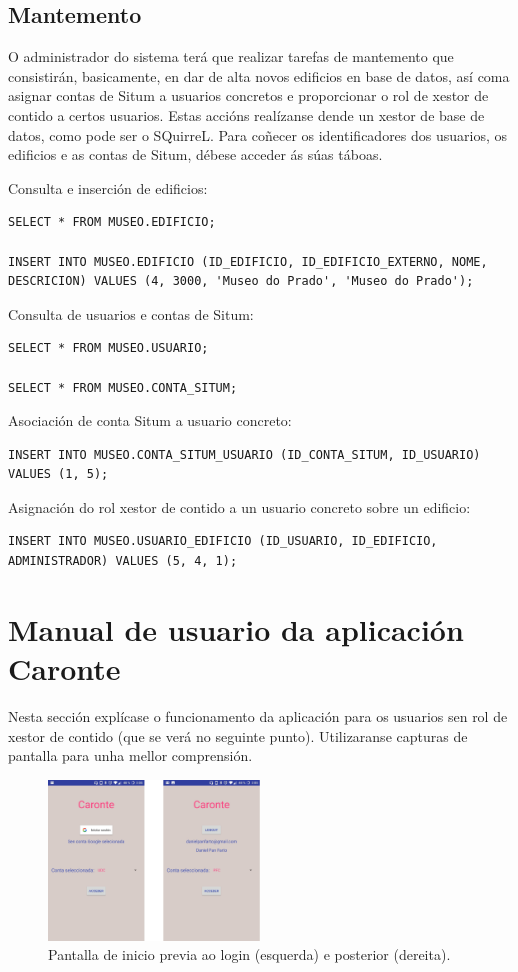 \subsection{Mantemento}
O administrador do sistema terá que realizar tarefas de mantemento que consistirán, basicamente, en dar de alta novos edificios en base de datos, así coma asignar contas de Situm a usuarios concretos e proporcionar o rol de xestor de contido a certos usuarios. Estas accións realízanse dende un xestor de base de datos, como pode ser o SQuirreL. Para coñecer os identificadores dos usuarios, os edificios e as contas de Situm, débese acceder ás súas táboas.

Consulta e inserción de edificios:
\begin{lstlisting}
SELECT * FROM MUSEO.EDIFICIO;

INSERT INTO MUSEO.EDIFICIO (ID_EDIFICIO, ID_EDIFICIO_EXTERNO, NOME, DESCRICION) VALUES (4, 3000, 'Museo do Prado', 'Museo do Prado');
\end{lstlisting}

Consulta de usuarios e contas de Situm:
\begin{lstlisting}
SELECT * FROM MUSEO.USUARIO;

SELECT * FROM MUSEO.CONTA_SITUM;
\end{lstlisting}

Asociación de conta Situm a usuario concreto:
\begin{lstlisting}
INSERT INTO MUSEO.CONTA_SITUM_USUARIO (ID_CONTA_SITUM, ID_USUARIO) VALUES (1, 5);
\end{lstlisting}

Asignación do rol xestor de contido a un usuario concreto sobre un edificio:
\begin{lstlisting}
INSERT INTO MUSEO.USUARIO_EDIFICIO (ID_USUARIO, ID_EDIFICIO, ADMINISTRADOR) VALUES (5, 4, 1);
\end{lstlisting}


\section{Manual de usuario da aplicación Caronte}
Nesta sección explícase o funcionamento da aplicación para os usuarios sen rol de xestor de contido (que se verá no seguinte punto). Utilizaranse capturas de pantalla para unha mellor comprensión.

\begin{figure}[h]
	\begin{center}
		\includegraphics[width=0.5\textwidth]{figures/android/capturaInicio}
		\caption{Pantalla de inicio previa ao login (esquerda) e posterior (dereita).}
		\label{fig:capturaInicio}
	\end{center}
\end{figure}

